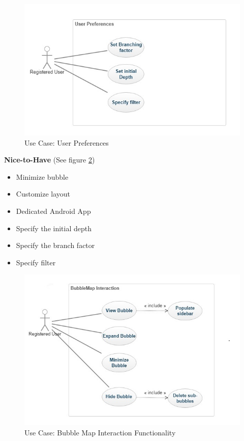 \documentclass[hidelinks,english]{article}
\begin{document}
			\begin{figure}[!h]
				\includegraphics[width=\linewidth]{User Preferences.jpg}
				\caption{Use Case: User Preferences}
				\label{UseCaseUserPreferences}
			\end{figure}
			\textbf{Nice-to-Have} (See figure \ref{UseCaseBubbleMapInteraction})
			\begin{itemize}
			    \item Minimize bubble
			    \item Customize layout
			    \item Dedicated Android App
				\item Specify the initial depth
			    \item Specify the branch factor
			    \item Specify filter
			\end{itemize}
			\begin{figure}[!h]
				\includegraphics[width=\linewidth]{BubbleMap Interaction.jpg}
				\caption{Use Case: Bubble Map Interaction Functionality}
				\label{UseCaseBubbleMapInteraction}
			\end{figure}
		
\end{document}
